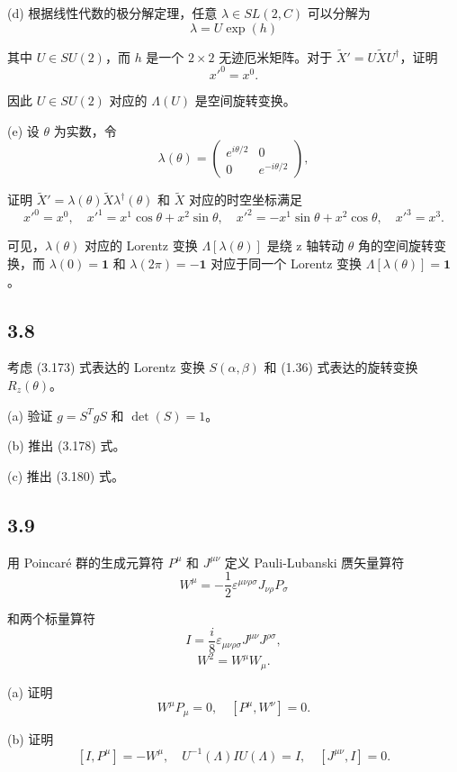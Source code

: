 (d) 根据线性代数的极分解定理，任意 $ \lambda \in SL(2, C) $ 可以分解为
$$ \lambda = U \exp(h) \tag{3.254} $$

其中 $ U \in SU(2) $，而 $ h $ 是一个 $ 2 \times 2 $ 无迹厄米矩阵。对于 $ \tilde{X}' = U \tilde{X} U^\dagger $，证明
$$ x'^0 = x^0. \tag{3.255} $$

因此 $ U \in SU(2) $ 对应的 $ \Lambda(U) $ 是空间旋转变换。

(e) 设 $ \theta $ 为实数，令
$$ \lambda(\theta) = \begin{pmatrix} e^{i\theta/2} & 0 \\ 0 & e^{-i\theta/2} \end{pmatrix}, \tag{3.256} $$

证明 $ \tilde{X}' = \lambda(\theta) \tilde{X} \lambda^\dagger(\theta) $ 和 $ \tilde{X} $ 对应的时空坐标满足
$$ x'^0 = x^0, \quad x'^1 = x^1 \cos \theta + x^2 \sin \theta, \quad x'^2 = -x^1 \sin \theta + x^2 \cos \theta, \quad x'^3 = x^3. \tag{3.257} $$

可见，$ \lambda(\theta) $ 对应的 Lorentz 变换 $ \Lambda[\lambda(\theta)] $ 是绕 z 轴转动 $ \theta $ 角的空间旋转变换，而 $ \lambda(0) = \mathbf{1} $ 和 $ \lambda(2\pi) = -\mathbf{1} $ 对应于同一个 Lorentz 变换 $ \Lambda[\lambda(\theta)] = \mathbf{1} $。

\newpage
\subsection{3.8}
考虑 (3.173) 式表达的 Lorentz 变换 $ S(\alpha, \beta) $ 和 (1.36) 式表达的旋转变换 $ R_z(\theta) $。

(a) 验证 $ g = S^T g S $ 和 $ \det(S) = 1 $。

(b) 推出 (3.178) 式。

(c) 推出 (3.180) 式。

\newpage
\subsection{3.9}
用 Poincaré 群的生成元算符 $ P^\mu $ 和 $ J^{\mu\nu} $ 定义 Pauli-Lubanski 赝矢量算符
$$ W^\mu = -\frac{1}{2} \varepsilon^{\mu\nu\rho\sigma} J_{\nu\rho} P_\sigma \tag{3.258} $$

和两个标量算符
$$ I = \frac{i}{8} \varepsilon_{\mu\nu\rho\sigma} J^{\mu\nu} J^{\rho\sigma}, \tag{3.259} $$
$$ W^2 = W^\mu W_\mu. \tag{3.260} $$

(a) 证明
$$ W^\mu P_\mu = 0, \quad [P^\mu, W^\nu] = 0. \tag{3.261} $$

(b) 证明
$$ [I, P^\mu] = -W^\mu, \quad U^{-1}(\Lambda) I U(\Lambda) = I, \quad [J^{\mu\nu}, I] = 0. \tag{3.262} $$

